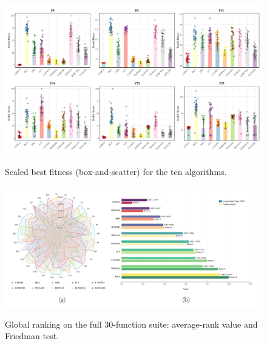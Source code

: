 \documentclass[review]{elsarticle}
\begin{document}
\begin{figure}
\caption{Scaled best fitness (box-and-scatter) for the ten
           algorithms.}
\includegraphics[width=\linewidth]{CDPLO-Cmp-boxplot}
\label{fig: CDPLO-Cmp-boxplot}
\end{figure}

\begin{figure}
\caption{Global ranking on the full 30-function suite:
           average-rank value and Friedman test.}
\includegraphics[width=\linewidth]{Cmp-FR}
\label{fig: Cmp-FR}
\end{figure}
\end{document}
